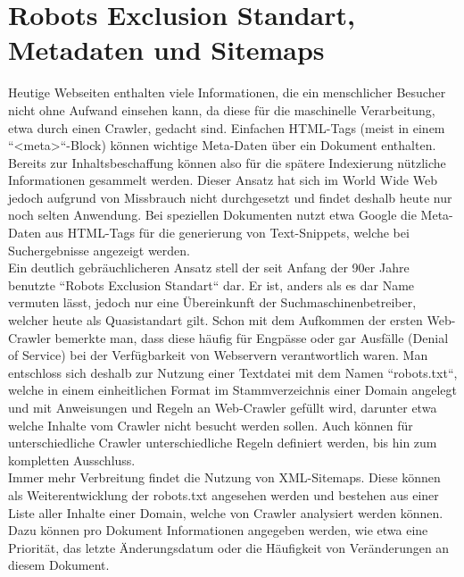 \section{Robots Exclusion Standart, Metadaten und Sitemaps}
Heutige Webseiten enthalten viele Informationen, die ein menschlicher Besucher nicht ohne Aufwand einsehen kann, da diese für die maschinelle Verarbeitung, etwa durch einen Crawler, gedacht sind. Einfachen HTML-Tags (meist in einem ``<meta>``-Block) können wichtige Meta-Daten über ein Dokument enthalten. Bereits zur Inhaltsbeschaffung können also für die spätere Indexierung nützliche Informationen gesammelt werden. Dieser Ansatz hat sich im World Wide Web jedoch aufgrund von Missbrauch nicht durchgesetzt und findet deshalb heute nur noch selten Anwendung. Bei speziellen Dokumenten nutzt etwa Google die Meta-Daten aus HTML-Tags für die generierung von Text-Snippets, welche bei Suchergebnisse angezeigt werden. \cite{suchmverst} \cite{htmlmeta}\\
Ein deutlich gebräuchlicheren Ansatz stell der seit Anfang der 90er Jahre benutzte ``Robots Exclusion Standart`` dar. Er ist, anders als es dar Name vermuten lässt, jedoch nur eine Übereinkunft der Suchmaschinenbetreiber, welcher heute als Quasistandart gilt. Schon mit dem Aufkommen der ersten Web-Crawler bemerkte man, dass diese häufig für Engpässe oder gar Ausfälle (Denial of Service) bei der Verfügbarkeit von Webservern verantwortlich waren. Man entschloss sich deshalb zur Nutzung einer Textdatei mit dem Namen ``robots.txt``, welche in einem einheitlichen Format im Stammverzeichnis einer Domain angelegt und mit Anweisungen und Regeln an Web-Crawler gefüllt wird, darunter etwa welche Inhalte vom Crawler nicht besucht werden sollen. Auch können für unterschiedliche Crawler unterschiedliche Regeln definiert werden, bis hin zum kompletten Ausschluss. \cite{suchmverst}\\
Immer mehr Verbreitung findet die Nutzung von XML-Sitemaps. Diese können als Weiterentwicklung der robots.txt angesehen werden und bestehen aus einer Liste aller Inhalte einer Domain, welche von Crawler analysiert werden können. Dazu können pro Dokument Informationen angegeben werden, wie etwa eine Priorität, das letzte Änderungsdatum oder die Häufigkeit von Veränderungen an diesem Dokument.\\
